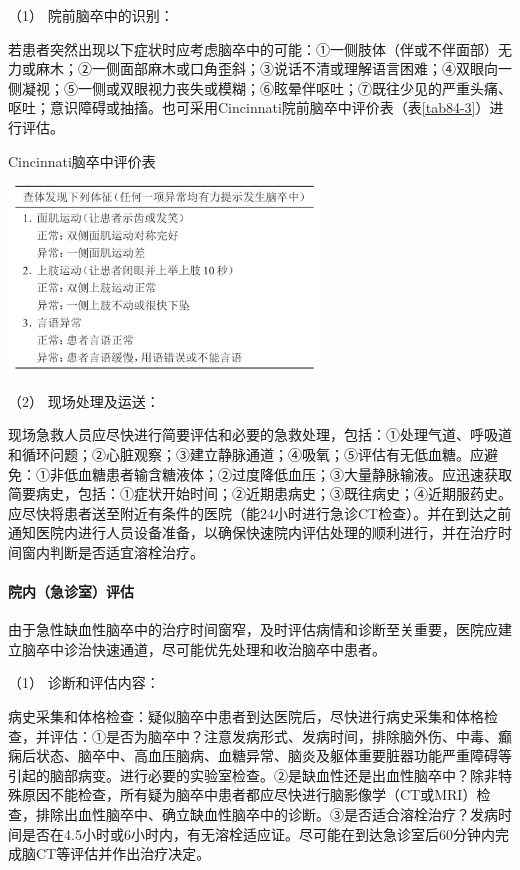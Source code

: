 \hypertarget{text00242.htmlux5cux23CHP8-1-2-3-2-1-1}{}
（1） 院前脑卒中的识别：

若患者突然出现以下症状时应考虑脑卒中的可能：①一侧肢体（伴或不伴面部）无力或麻木；②一侧面部麻木或口角歪斜；③说话不清或理解语言困难；④双眼向一侧凝视；⑤一侧或双眼视力丧失或模糊；⑥眩晕伴呕吐；⑦既往少见的严重头痛、呕吐；意识障碍或抽搐。也可采用Cincinnati院前脑卒中评价表（表\ref{tab84-3}）进行评估。

\begin{table}[htbp]
\centering
\caption{Cincinnati脑卒中评价表}
\label{tab84-3}
\includegraphics[width=3.25in,height=1.95833in]{./images/Image00372.jpg}
\end{table}

\hypertarget{text00242.htmlux5cux23CHP8-1-2-3-2-1-2}{}
（2） 现场处理及运送：

现场急救人员应尽快进行简要评估和必要的急救处理，包括：①处理气道、呼吸道和循环问题；②心脏观察；③建立静脉通道；④吸氧；⑤评估有无低血糖。应避免：①非低血糖患者输含糖液体；②过度降低血压；③大量静脉输液。应迅速获取简要病史，包括：①症状开始时间；②近期患病史；③既往病史；④近期服药史。应尽快将患者送至附近有条件的医院（能24小时进行急诊CT检查）。并在到达之前通知医院内进行人员设备准备，以确保快速院内评估处理的顺利进行，并在治疗时间窗内判断是否适宜溶栓治疗。

\paragraph{院内（急诊室）评估}

由于急性缺血性脑卒中的治疗时间窗窄，及时评估病情和诊断至关重要，医院应建立脑卒中诊治快速通道，尽可能优先处理和收治脑卒中患者。

\hypertarget{text00242.htmlux5cux23CHP8-1-2-3-2-2-1}{}
（1） 诊断和评估内容：

病史采集和体格检查：疑似脑卒中患者到达医院后，尽快进行病史采集和体格检查，并评估：①是否为脑卒中？注意发病形式、发病时间，排除脑外伤、中毒、癫痫后状态、脑卒中、高血压脑病、血糖异常、脑炎及躯体重要脏器功能严重障碍等引起的脑部病变。进行必要的实验室检查。②是缺血性还是出血性脑卒中？除非特殊原因不能检查，所有疑为脑卒中患者都应尽快进行脑影像学（CT或MRI）检查，排除出血性脑卒中、确立缺血性脑卒中的诊断。③是否适合溶栓治疗？发病时间是否在4.5小时或6小时内，有无溶栓适应证。尽可能在到达急诊室后60分钟内完成脑CT等评估并作出治疗决定。

